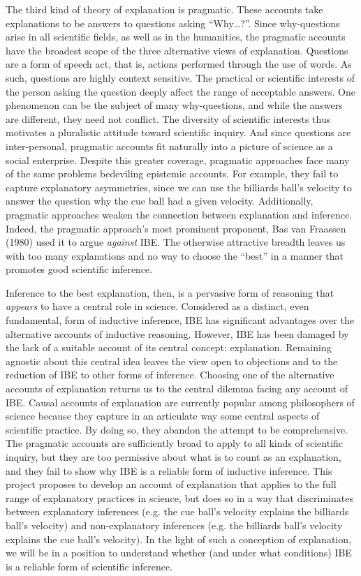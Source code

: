 \documentclass{article}[11pt]
\begin{document}
The third kind of theory of explanation is pragmatic.  These accounts take explanations to be answers to questions asking ``Why\dots ?''. Since why-questions arise in all scientific fields, as well as in the humanities, the pragmatic accounts  have the broadest scope of the three alternative views of explanation.  Questions are a form of speech act, that is, actions performed through the use of words.  As such, questions are highly context sensitive. The practical or scientific interests of the person asking the question deeply affect the range of acceptable answers. One phenomenon can be the subject of many why-questions, and while the answers are different, they need not conflict. The diversity of scientific interests thus motivates a pluralistic attitude toward scientific inquiry.  And since questions are inter-personal, pragmatic accounts fit naturally into a picture of science as a social enterprise.  Despite this greater coverage, pragmatic approaches face many of the same problems bedeviling epistemic accounts.  For example, they fail to capture explanatory asymmetries, since we can use the billiards ball's velocity to answer the question why the cue ball had a given velocity. Additionally, pragmatic approaches weaken the connection between explanation and inference. Indeed, the pragmatic approach's most prominent proponent, Bas van Fraassen (1980) used it to argue \textit{against} IBE. The otherwise attractive breadth leaves us with too many explanations and no way to choose the ``best'' in a manner that promotes good scientific inference.

Inference to the best explanation, then, is a pervasive form of reasoning that \textit{appears} to have a central role in science.  Considered as a distinct, even fundamental, form of inductive inference, IBE has significant advantages over the alternative accounts of inductive reasoning.  However, IBE has been damaged by the lack of a suitable account of its central concept: explanation.  Remaining agnostic about this central idea leaves the view open to objections and to the reduction of IBE to other forms of inference.  Choosing one of the alternative accounts of explanation returns us to the central dilemma facing any account of IBE.  Causal accounts of explanation are currently popular among philosophers of science because they capture in an articulate way some central aspects of scientific practice.  By doing so, they abandon the attempt to be comprehensive.  The pragmatic accounts are sufficiently broad to apply to all kinds of scientific inquiry, but they are too permissive about what is to count as an explanation, and they fail to show why IBE is a reliable form of inductive inference.  This project proposes to develop an account of explanation that applies to the full range of explanatory practices in science, but does so in a way that discriminates between explanatory inferences (e.g. the cue ball's velocity explains the billiards ball's velocity) and non-explanatory inferences (e.g. the billiards ball's velocity explains the cue ball's velocity).  In the light of such a conception of explanation, we will be in a position to understand  whether (and under what conditions) IBE is a reliable form of scientific inference.
\end{document}
